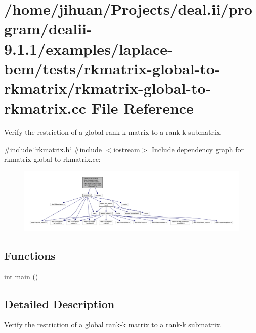 \hypertarget{rkmatrix-global-to-rkmatrix_8cc}{}\section{/home/jihuan/\+Projects/deal.ii/program/dealii-\/9.1.1/examples/laplace-\/bem/tests/rkmatrix-\/global-\/to-\/rkmatrix/rkmatrix-\/global-\/to-\/rkmatrix.cc File Reference}
\label{rkmatrix-global-to-rkmatrix_8cc}


Verify the restriction of a global rank-\/k matrix to a rank-\/k submatrix.  


{\ttfamily \#include \char`\"{}rkmatrix.\+h\char`\"{}}\newline
{\ttfamily \#include $<$iostream$>$}\newline
Include dependency graph for rkmatrix-\/global-\/to-\/rkmatrix.cc\+:
\nopagebreak
\begin{figure}[H]
\begin{center}
\leavevmode
\includegraphics[width=350pt]{rkmatrix-global-to-rkmatrix_8cc__incl}
\end{center}
\end{figure}
\subsection*{Functions}
\begin{DoxyCompactItemize}
\item 
int \hyperlink{rkmatrix-global-to-rkmatrix_8cc_ae66f6b31b5ad750f1fe042a706a4e3d4}{main} ()
\end{DoxyCompactItemize}


\subsection{Detailed Description}
Verify the restriction of a global rank-\/k matrix to a rank-\/k submatrix. 

